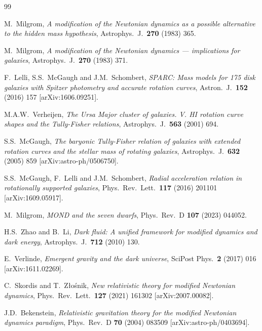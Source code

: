 \documentclass[a4paper,11pt]{article}
\begin{document}

\begin{thebibliography}{99}

  M.~Milgrom,
  \emph{A modification of the Newtonian dynamics as a possible alternative to
  the hidden mass hypothesis},
  Astrophys.\ J.\ \textbf{270} (1983) 365.

  M.~Milgrom,
  \emph{A modification of the Newtonian dynamics --- implications for galaxies},
  Astrophys.\ J.\ \textbf{270} (1983) 371.

  F.~Lelli, S.S.~McGaugh and J.M.~Schombert,
  \emph{SPARC: Mass models for 175 disk galaxies with Spitzer photometry and
  accurate rotation curves},
  Astron.\ J.\ \textbf{152} (2016) 157 [arXiv:1606.09251].

  M.A.W.~Verheijen,
  \emph{The Ursa Major cluster of galaxies. V. HI rotation curve shapes and
  the Tully-Fisher relations},
  Astrophys.\ J.\ \textbf{563} (2001) 694.

  S.S.~McGaugh,
  \emph{The baryonic Tully-Fisher relation of galaxies with extended rotation
  curves and the stellar mass of rotating galaxies},
  Astrophys.\ J.\ \textbf{632} (2005) 859 [arXiv:astro-ph/0506750].

  S.S.~McGaugh, F.~Lelli and J.M.~Schombert,
  \emph{Radial acceleration relation in rotationally supported galaxies},
  Phys.\ Rev.\ Lett.\ \textbf{117} (2016) 201101 [arXiv:1609.05917].

  M.~Milgrom,
  \emph{MOND and the seven dwarfs},
  Phys.\ Rev.\ D \textbf{107} (2023) 044052.

  H.S.~Zhao and B.~Li,
  \emph{Dark fluid: A unified framework for modified dynamics and dark energy},
  Astrophys.\ J.\ \textbf{712} (2010) 130.

  E.~Verlinde,
  \emph{Emergent gravity and the dark universe},
  SciPost Phys.\ \textbf{2} (2017) 016 [arXiv:1611.02269].

  C.~Skordis and T.~Z{\l}o{\'s}nik,
  \emph{New relativistic theory for modified Newtonian dynamics},
  Phys.\ Rev.\ Lett.\ \textbf{127} (2021) 161302 [arXiv:2007.00082].

  J.D.~Bekenstein,
  \emph{Relativistic gravitation theory for the modified Newtonian dynamics
  paradigm},
  Phys.\ Rev.\ D \textbf{70} (2004) 083509 [arXiv:astro-ph/0403694].


\end{thebibliography}
\end{document}
